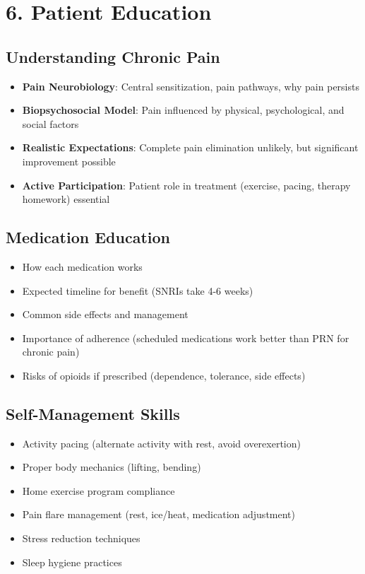 \documentclass[11pt,letterpaper]{article}
\begin{document}
\section*{6. Patient Education}

\subsection*{Understanding Chronic Pain}

\begin{itemize}[leftmargin=*]
    \item \textbf{Pain Neurobiology}: Central sensitization, pain pathways, why pain persists
    \item \textbf{Biopsychosocial Model}: Pain influenced by physical, psychological, and social factors
    \item \textbf{Realistic Expectations}: Complete pain elimination unlikely, but significant improvement possible
    \item \textbf{Active Participation}: Patient role in treatment (exercise, pacing, therapy homework) essential
\end{itemize}

\subsection*{Medication Education}

\begin{itemize}[leftmargin=*]
    \item How each medication works
    \item Expected timeline for benefit (SNRIs take 4-6 weeks)
    \item Common side effects and management
    \item Importance of adherence (scheduled medications work better than PRN for chronic pain)
    \item Risks of opioids if prescribed (dependence, tolerance, side effects)
\end{itemize}

\subsection*{Self-Management Skills}

\begin{itemize}[leftmargin=*]
    \item Activity pacing (alternate activity with rest, avoid overexertion)
    \item Proper body mechanics (lifting, bending)
    \item Home exercise program compliance
    \item Pain flare management (rest, ice/heat, medication adjustment)
    \item Stress reduction techniques
    \item Sleep hygiene practices
\end{itemize}
\end{document}
